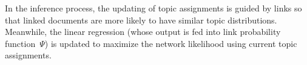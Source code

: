 In the inference process, the updating of topic assignments is guided
by links so that linked documents are more likely to have similar
topic distributions.  Meanwhile, the linear regression (whose
output is fed into link probability function~$\Psi$) is updated to
maximize the network likelihood using current topic assignments.
